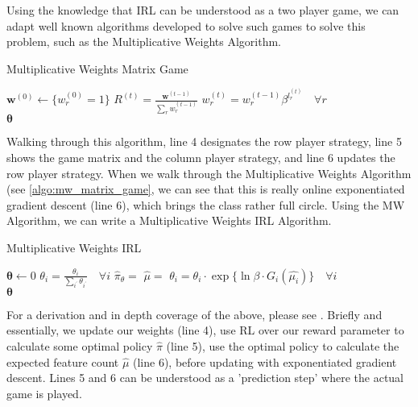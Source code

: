 \documentclass[11pt]{article}
\begin{document}
Using the knowledge that IRL can be understood as a two player game, we can adapt well known algorithms developed to solve such games to solve this problem, such as the Multiplicative Weights Algorithm.


\begin{algorithm}[H]
    \label{algo:mw_matrix_game}
    \caption{Multiplicative Weights Matrix Game}
    \begin{algorithmic}[1]
    \State $\boldsymbol{w}^{(0)} \leftarrow \{ w_r^{(0)} = 1\}$
    \State $R^{(t)} = \frac{\boldsymbol{w}^{(t-1)}}{\sum_r w_r^{(t-1)}}$ 
    \State {}
    \State $w_r^{(t)} = w_r^{(t-1)} \beta^{l_r^{(t)}} \quad \forall r$
    \EndFor \\
    \Return $\boldsymbol{\theta}$
    \EndFunction
    \end{algorithmic}
\end{algorithm}

Walking through this algorithm, line 4 designates the row player strategy, line 5 shows the game matrix and the column player strategy, and line 6 updates the row player strategy. When we walk through the Multiplicative Weights Algorithm (see \ref{algo:mw_matrix_game}, we can see that this is really online exponentiated gradient descent (line 6), which brings the class rather full circle. Using the MW Algorithm, we can write a Multiplicative Weights IRL Algorithm.

\begin{algorithm}[H]
    \label{algo:mw_irl}
    \caption{Multiplicative Weights IRL}
    \begin{algorithmic}[1]
    \State $\boldsymbol{\theta} \leftarrow 0$
    \State $\theta_i = \frac{\theta_i}{\sum_{i^{'}} \theta_{i^{'}}} \quad \forall i$
    \State $\hat{\pi}_\theta = $ 
    \State $\hat{\mu} = $ 
    \State $\theta_i = \theta_i \cdot \exp{\{\ln{\beta \cdot G_i(\hat{\mu_i})}\}} \quad \forall i$
    \EndFor \\
    \Return $\boldsymbol{\theta}$
    \EndFunction
    \end{algorithmic}
\end{algorithm}

For a derivation and in depth coverage of the above, please see \cite{MGIRL}. Briefly and essentially, we update our weights (line 4), use RL over our reward parameter to calculate some optimal policy $\hat{\pi}$ (line 5), use the optimal policy to calculate the expected feature count $\hat{\mu}$ (line 6), before updating with exponentiated gradient descent. Lines 5 and 6 can be understood as a 'prediction step' where the actual game is played.
\end{document}
